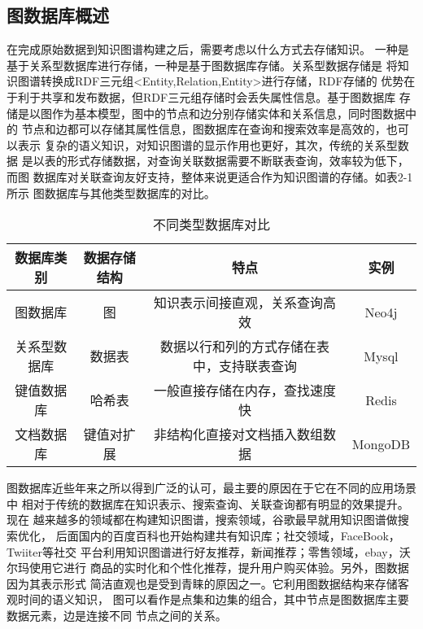\documentclass{standalone}
\begin{document}
\subsection{图数据库概述}
在完成原始数据到知识图谱构建之后，需要考虑以什么方式去存储知识。
一种是基于关系型数据库进行存储，一种是基于图数据库存储。关系型数据存储是
将知识图谱转换成RDF三元组<Entity,Relation,Entity>进行存储，RDF存储的
优势在于利于共享和发布数据，但RDF三元组存储时会丢失属性信息。基于图数据库
存储是以图作为基本模型，图中的节点和边分别存储实体和关系信息，同时图数据中的
节点和边都可以存储其属性信息，图数据库在查询和搜索效率是高效的，也可以表示
复杂的语义知识，对知识图谱的显示作用也更好，其次，传统的关系型数据
是以表的形式存储数据，对查询关联数据需要不断联表查询，效率较为低下，而图
数据库对关联查询友好支持，整体来说更适合作为知识图谱的存储。如表2-1所示
图数据库与其他类型数据库的对比。
\begin{table}[h]
	\caption{不同类型数据库对比} 
	\begin{tabular}{|c|c|c|c|} 
		\hline  
		数据库类别 & 数据存储结构 & 特点 & 实例 \\
		\hline 
		图数据库 & 图 & 知识表示间接直观，关系查询高效 
		& Neo4j\\  
		\hline  
		关系型数据库 & 数据表 & 数据以行和列的方式存储在表中，支持联表查询 
		& Mysql\\  
		\hline  
		键值数据库 & 哈希表 & 一般直接存储在内存，查找速度快
		& Redis \\  
		\hline 
		文档数据库 & 键值对扩展 & 非结构化直接对文档插入数组数据
		& MongoDB\\  
		\hline 
	\end{tabular}
	\label{tablea}
\end{table}
图数据库近些年来之所以得到广泛的认可，最主要的原因在于它在不同的应用场景中
相对于传统的数据库在知识表示、搜索查询、关联查询都有明显的效果提升。现在
越来越多的领域都在构建知识图谱，搜索领域，谷歌最早就用知识图谱做搜索优化，
后面国内的百度百科也开始构建共有知识库；社交领域，FaceBook，Twiiter等社交
平台利用知识图谱进行好友推荐，新闻推荐；零售领域，ebay，沃尔玛使用它进行
商品的实时化和个性化推荐，提升用户购买体验。另外，图数据因为其表示形式
简洁直观也是受到青睐的原因之一。它利用图数据结构来存储客观时间的语义知识，
图可以看作是点集和边集的组合，其中节点是图数据库主要数据元素，边是连接不同
节点之间的关系。
\end{document}
